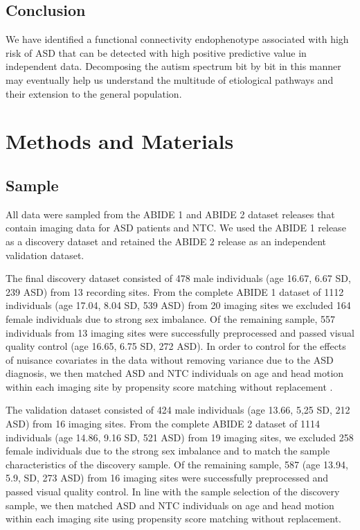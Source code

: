 \documentclass[9pt,lineno]{elife}
\begin{document}
\subsection{Conclusion}
We have identified a functional connectivity endophenotype associated with high risk of ASD that can be detected with high positive predictive value in independent data. Decomposing the autism spectrum bit by bit in this manner may eventually help us understand the multitude of etiological pathways and their extension to the general population.

\section{Methods and Materials}
\label{methods}
\subsection{Sample}
All data were sampled from the ABIDE 1 \citep{Di_Martino2014-po} and ABIDE 2 \citep{Di_Martino2017-md} dataset releases that contain imaging data for ASD patients and NTC. We used the ABIDE 1 release as a discovery dataset and retained the ABIDE 2 release as an independent validation dataset.

The final discovery dataset consisted of 478 male individuals (age 16.67, 6.67 SD, 239 ASD) from 13 recording sites. From the complete ABIDE 1 dataset of 1112 individuals (age 17.04, 8.04 SD, 539 ASD) from 20 imaging sites we excluded 164 female individuals due to strong sex imbalance. Of the remaining sample, 557 individuals from 13 imaging sites were successfully preprocessed and passed visual quality control (age 16.65, 6.75 SD, 272 ASD). In order to control for the effects of nuisance covariates in the data without removing variance due to the ASD diagnosis, we then matched ASD and NTC individuals on age and head motion within each imaging site by propensity score matching without replacement \citep{Rosenbaum1985-ib}. 

The validation dataset consisted of 424 male individuals (age 13.66, 5,25 SD, 212 ASD) from 16 imaging sites. From the complete ABIDE 2 dataset of 1114 individuals (age 14.86, 9.16 SD, 521 ASD) from 19 imaging sites, we excluded 258 female individuals due to the strong sex imbalance and to match the sample characteristics of the discovery sample. Of the remaining sample, 587 (age 13.94, 5.9, SD, 273 ASD) from 16 imaging sites were successfully preprocessed and passed visual quality control. In line with the sample selection of the discovery sample, we then matched ASD and NTC individuals on age and head motion within each imaging site using propensity score matching without replacement.
\end{document}

